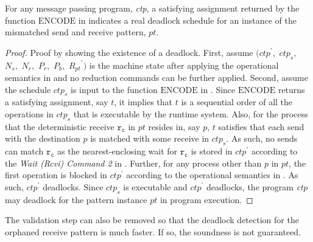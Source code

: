 

\begin{lemma}
For any message passing program, \textit{ctp}, a satisfying assignment returned by the function $\mathrm{ENCODE}$ in  indicates a real deadlock schedule for an instance of the mismatched send and receive pattern, $\mathit{pt}$. 
\label{lemma:mismatch}
\end{lemma}
\begin{proof}
Proof by showing the existence of a deadlock. First, assume $(\mathit{ctp}^\prime,$ $\mathit{ctp}_s,$ $\mathit{N_s},$ $\mathit{N_r},$ $\mathit{P_r},$ $\mathit{P_b},$ $\mathit{R_{pt}}^\prime)$ is the machine state after applying the operational semantics in  and no reduction commands can be further applied. Second, assume the schedule $\mathit{ctp}_s$ is input to the function $\mathrm{ENCODE}$ in . Since $\mathrm{ENCODE}$ returns a satisfying assignment, say $\mathit{t}$, it implies that $\mathit{t}$ is a sequential order of all the operations in $\mathit{ctp}_s$ that is executable by the runtime system. Also, for the process that the deterministic receive $\mathtt{r_c}$ in $\mathit{pt}$ resides in, say $\mathit{p}$, $\mathit{t}$ satisfies that each send with the destination $\mathit{p}$ is matched with some receive in $\mathit{ctp}_s$. As such, no sends can match $\mathtt{r_c}$ as the nearest-enclosing wait for $\mathtt{r_c}$ is stored in $\mathit{ctp}^\prime$ according to the \emph{Wait (Rcvi) Command 2} in . Further, for any process other than $\mathit{p}$ in $\mathit{pt}$, the first operation is blocked in $\mathit{ctp}^\prime$ according to the operational semantics in . As such, $\mathit{ctp}^\prime$ deadlocks. Since $\mathit{ctp}_s$ is executable and $\mathit{ctp}^\prime$ deadlocks, the program \textit{ctp} may deadlock for the pattern instance $\mathit{pt}$ in program execution. 
\end{proof}

The validation step can also be removed so that the deadlock detection for the orphaned receive pattern is much faster. If so, the soundness is not guaranteed. 


